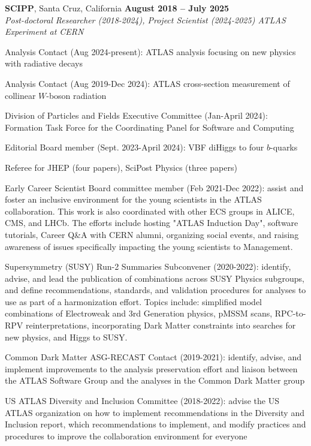 \documentclass[margin,line]{resume}
\begin{document}
\begin{resume}
\textbf{SCIPP}, Santa Cruz, California \hfill \textbf{August 2018 -- July 2025}\\
\textsl{Post-doctoral Researcher (2018-2024), Project Scientist (2024-2025) ATLAS Experiment at CERN}
\begin{list2}
  \item Analysis Contact (Aug 2024-present): ATLAS analysis focusing on new physics with radiative decays
  \item Analysis Contact (Aug 2019-Dec 2024): ATLAS cross-section measurement of collinear $W$-boson radiation~\cite{ATLAS:2024mow}
  \item Division of Particles and Fields Executive Committee (Jan-April 2024): Formation Task Force for the Coordinating Panel for Software and Computing
  \item Editorial Board member (Sept. 2023-April 2024): VBF diHiggs to four $b$-quarks
  \item Referee for JHEP (four papers), SciPost Physics (three papers)
  \item Early Career Scientist Board committee member (Feb 2021-Dec 2022): assist and foster an inclusive environment for the young scientists in the ATLAS collaboration. This work is also coordinated with other ECS groups in ALICE, CMS, and LHCb. The efforts include hosting "ATLAS Induction Day", software tutorials, Career Q\&A with CERN alumni, organizing social events, and raising awareness of issues specifically impacting the young scientists to Management.
  \item Supersymmetry (SUSY) Run-2 Summaries Subconvener (2020-2022): identify, advise, and lead the publication of combinations across SUSY Physics subgroups, and define recommendations, standards, and validation procedures for analyses to use as part of a harmonization effort. Topics include: simplified model combinations of Electroweak and 3rd Generation physics, pMSSM scans, RPC-to-RPV reinterpretations, incorporating Dark Matter constraints into searches for new physics, and Higgs to SUSY.
  \item Common Dark Matter ASG-RECAST Contact (2019-2021): identify, advise, and implement improvements to the analysis preservation effort and liaison between the ATLAS Software Group and the analyses in the Common Dark Matter group
  \item US ATLAS Diversity and Inclusion Committee (2018-2022): advise the US ATLAS organization on how to implement recommendations in the Diversity and Inclusion report, which recommendations to implement, and modify practices and procedures to improve the collaboration environment for everyone

\end{list2}
\end{resume}
\end{document}
